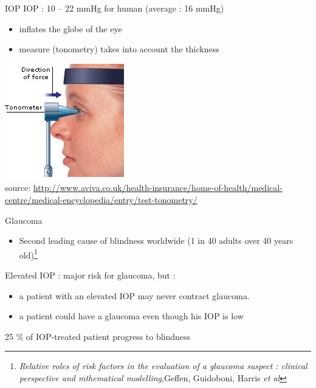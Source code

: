 \begin{frame}{IOP}
IOP : 10 -- 22 mmHg for human (average : 16 mmHg)
\begin{itemize}
\item inflates the globe of the eye
\item measure (tonometry) takes into account the thickness 
\end{itemize}
%
%
\begin{center}
\includegraphics[scale=.6]{Tonometry.jpg}\\
\tiny{source: \url{http://www.aviva.co.uk/health-insurance/home-of-health/medical-centre/medical-encyclopedia/entry/test-tonometry/}}
\end{center}
\end{frame}

\begin{frame}{Glaucoma}
\begin{itemize}
\item Second leading cause of blindness worldwide (1 in 40 adults over 40 years old)\footnote{\textit{Relative roles of risk factors in the evaluation of a glaucoma suspect : clinical perspective and mthematical modelling},Geffen, Guidoboni, Harris \textit{et al}}
\end{itemize}
Elevated IOP : major risk for glaucoma, but : 
\begin{itemize}
\item a patient with an elevated IOP may never contract glaucoma. 
\item a patient could have a glaucoma even though his IOP is low
\end{itemize}
\begin{center}
\alert{ 25 \% of IOP-treated patient progress to blindness}

\end{center}

\end{frame}


